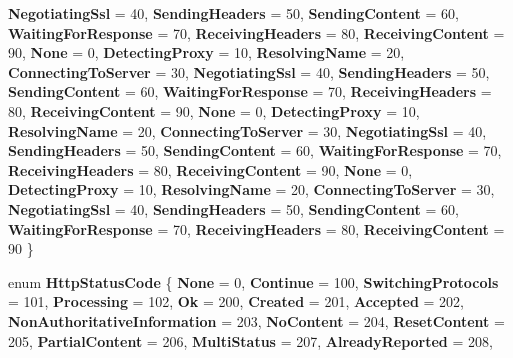 \begin{DoxyCompactItemize}
{\bfseries Negotiating\+Ssl} = 40, 
{\bfseries Sending\+Headers} = 50, 
\newline
{\bfseries Sending\+Content} = 60, 
{\bfseries Waiting\+For\+Response} = 70, 
{\bfseries Receiving\+Headers} = 80, 
{\bfseries Receiving\+Content} = 90, 
\newline
{\bfseries None} = 0, 
{\bfseries Detecting\+Proxy} = 10, 
{\bfseries Resolving\+Name} = 20, 
{\bfseries Connecting\+To\+Server} = 30, 
\newline
{\bfseries Negotiating\+Ssl} = 40, 
{\bfseries Sending\+Headers} = 50, 
{\bfseries Sending\+Content} = 60, 
{\bfseries Waiting\+For\+Response} = 70, 
\newline
{\bfseries Receiving\+Headers} = 80, 
{\bfseries Receiving\+Content} = 90, 
{\bfseries None} = 0, 
{\bfseries Detecting\+Proxy} = 10, 
\newline
{\bfseries Resolving\+Name} = 20, 
{\bfseries Connecting\+To\+Server} = 30, 
{\bfseries Negotiating\+Ssl} = 40, 
{\bfseries Sending\+Headers} = 50, 
\newline
{\bfseries Sending\+Content} = 60, 
{\bfseries Waiting\+For\+Response} = 70, 
{\bfseries Receiving\+Headers} = 80, 
{\bfseries Receiving\+Content} = 90, 
\newline
{\bfseries None} = 0, 
{\bfseries Detecting\+Proxy} = 10, 
{\bfseries Resolving\+Name} = 20, 
{\bfseries Connecting\+To\+Server} = 30, 
\newline
{\bfseries Negotiating\+Ssl} = 40, 
{\bfseries Sending\+Headers} = 50, 
{\bfseries Sending\+Content} = 60, 
{\bfseries Waiting\+For\+Response} = 70, 
\newline
{\bfseries Receiving\+Headers} = 80, 
{\bfseries Receiving\+Content} = 90
 \}
\item 
\mbox{\label{namespace_windows_1_1_web_1_1_http_a2378c3ed9d3b208a45e8b6dcc91ea4e4}} 
enum {\bfseries Http\+Status\+Code} \{ \newline
{\bfseries None} = 0, 
{\bfseries Continue} = 100, 
{\bfseries Switching\+Protocols} = 101, 
{\bfseries Processing} = 102, 
\newline
{\bfseries Ok} = 200, 
{\bfseries Created} = 201, 
{\bfseries Accepted} = 202, 
{\bfseries Non\+Authoritative\+Information} = 203, 
\newline
{\bfseries No\+Content} = 204, 
{\bfseries Reset\+Content} = 205, 
{\bfseries Partial\+Content} = 206, 
{\bfseries Multi\+Status} = 207, 
\newline
{\bfseries Already\+Reported} = 208, 

\end{DoxyCompactItemize}
